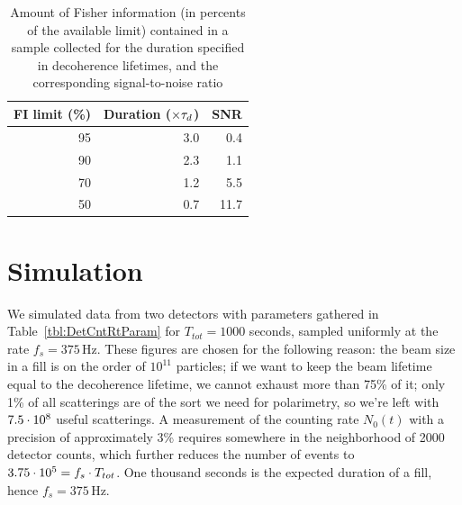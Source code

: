 \documentclass{jacow}
\begin{document}
\begin{table}[h]
	\caption{Amount of Fisher information (in percents of the available limit) contained in a sample collected for the duration specified in decoherence lifetimes, and the corresponding signal-to-noise ratio\label{tbl:FItot}}
	
	\centering
	\begin{tabular}{rrr}
		\hline
		FI limit (\%) & Duration ($\times\tau_d$) & SNR  \\
		\hline
		95            & 3.0                     & 0.4         \\
		90            & 2.3                     & 1.1         \\
		70            & 1.2                     & 5.5         \\
		50            & 0.7                     & 11.7        \\
		\hline
	\end{tabular}
\end{table}

\section{Simulation}
We simulated data from two detectors with parameters gathered in Table~\ref{tbl:DetCntRtParam} for $T_{tot}=1000$ seconds, sampled uniformly at the rate $f_s = 375$\,Hz. These figures are chosen for the following reason: the beam size in a fill is on the order of $10^{11}$ particles; if we want to keep the beam lifetime equal to the decoherence lifetime, we cannot exhaust more than 75\% of it; only 1\% of all scatterings are of the sort we need for polarimetry, so we're left with ${7.5}\cdot 10^{8}$ useful scatterings. A measurement of the counting rate $N_0(t)$ with a precision of approximately 3\% requires somewhere in the neighborhood of 2000 detector counts, which further reduces the number of events to ${3.75}\cdot 10^{5}= f_s\cdot T_{tot}$. One thousand seconds is the expected duration of a fill, hence $f_s = 375$\,Hz. 
\end{document}

